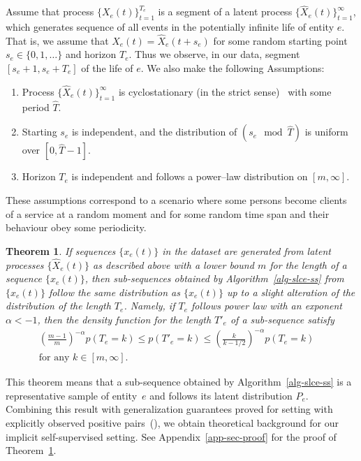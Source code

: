 \documentclass[sigconf, anonymous]{acmart}
\newtheorem{thm}{Theorem}
\begin{document}
Assume that process $\{X_e(t)\}_{t=1}^{T_e}$ is a segment of a latent process $\{\widehat{X}_e(t)\}_{t=1}^{\infty}$, which generates sequence of all events in the potentially infinite life of entity $e$. That is, we assume that $X_e(t)=\widehat{X}_e(t+s_e)$ for some random starting point $s_e\in \{0,1,\ldots\}$ and horizon $T_e$. Thus we observe, in our data, segment $[s_e+1,s_e+T_e]$ of the life of $e$. We also make the following Assumptions:
\begin{enumerate}
    \item Process $\{\widehat{X}_e(t)\}_{t=1}^{\infty}$ is cyclostationary (in the strict sense)~\citep{Gardner2006Cyclostationarity} with some period $\widehat{T}$.
    \item Starting $s_e$ is independent, and the distribution of $(s_e \mod \widehat{T})$ is uniform over $[0,\widehat{T}-1]$.
    \item Horizon $T_e$ is independent and follows a power--law distribution on $[m,\infty]$.
\end{enumerate}
These assumptions correspond to a scenario where some persons become clients of a service at a random moment and for some random time span and their behaviour obey some periodicity.    %
\begin{thm}\label{thm:distribution}
If sequences $\{x_e(t)\}$ in the dataset are generated from latent processes $\{\widehat{X}_e(t)\}$ as described above with a lower bound $m$ for the length of a sequence $\{x_e(t)\}$, then sub-sequences obtained by Algorithm~\ref{alg-slce-ss} from $\{x_e(t)\}$ follow the same distribution as $\{x_e(t)\}$ up to a slight alteration of the distribution of the length $T_e$. Namely, if $T_e$ follows power law with an exponent $\alpha <-1$, then the density function for the length $T'_e$ of a sub-sequence satisfy 
\begin{multline}\label{probability_ratio}
    \left (\frac{m-1}{m}\right )^{-\alpha} p(T_e=k)\leq p(T'_e=k) \leq \left(\frac{k}{k-1/2}\right )^{-\alpha} p(T_e=k)  \quad \\ \mbox{for any } k\in [m,\infty].
\end{multline}
\end{thm}
This theorem means that a sub-sequence obtained by Algorithm~\ref{alg-slce-ss} is a representative sample of entity~$e$ and follows its latent distribution $P_e$. Combining this result with generalization guarantees proved for setting with explicitly observed positive pairs~(\cite{Saunshi2019ICML}), we obtain theoretical background for our implicit self-supervised setting.   
See Appendix~\ref{app-sec-proof} for the proof of Theorem~\ref{thm:distribution}.
\end{document}
